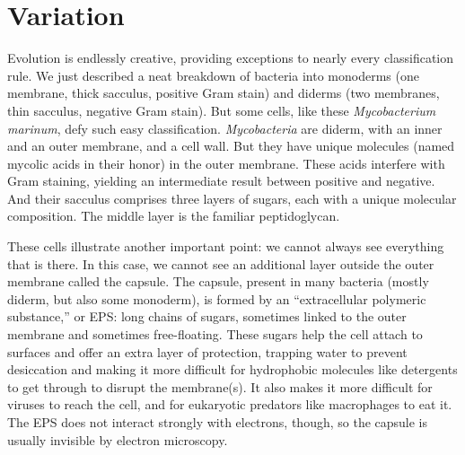 \documentclass[]{tufte-book}
\begin{document}
\section{Variation}\label{variation}

Evolution is endlessly creative, providing exceptions to nearly every
classification rule. We just described a neat breakdown of bacteria into
monoderms (one membrane, thick sacculus, positive Gram stain) and
diderms (two membranes, thin sacculus, negative Gram stain). But some
cells, like these \emph{Mycobacterium marinum}, defy such easy
classification. \emph{Mycobacteria} are diderm, with an inner and an
outer membrane, and a cell wall. But they have unique molecules (named
mycolic acids in their honor) in the outer membrane. These acids
interfere with Gram staining, yielding an intermediate result between
positive and negative. And their sacculus comprises three layers of
sugars, each with a unique molecular composition. The middle layer is
the familiar peptidoglycan.

These cells illustrate another important point: we cannot always see
everything that is there. In this case, we cannot see an additional
layer outside the outer membrane called the capsule. The capsule,
present in many bacteria (mostly diderm, but also some monoderm), is
formed by an ``extracellular polymeric substance,'' or EPS: long chains
of sugars, sometimes linked to the outer membrane and sometimes
free-floating. These sugars help the cell attach to surfaces and offer
an extra layer of protection, trapping water to prevent desiccation and
making it more difficult for hydrophobic molecules like detergents to
get through to disrupt the membrane(s). It also makes it more difficult
for viruses to reach the cell, and for eukaryotic predators like
macrophages to eat it. The EPS does not interact strongly with
electrons, though, so the capsule is usually invisible by electron
microscopy.
\end{document}
